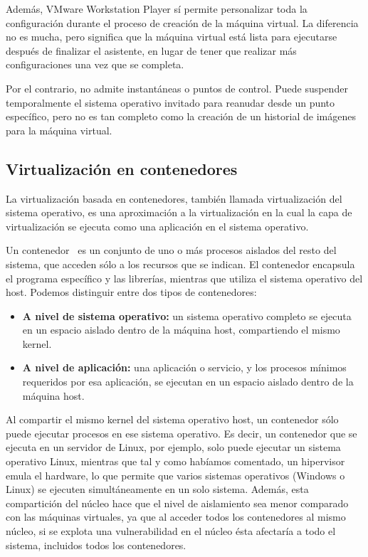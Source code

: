 	Además, VMware Workstation Player sí permite personalizar toda la configuración durante el proceso de creación de la máquina virtual. La diferencia no es mucha, pero significa que la máquina virtual está lista para ejecutarse después de finalizar el asistente, en lugar de tener que realizar más configuraciones una vez que se completa.

	Por el contrario, no admite instantáneas o puntos de control. Puede suspender temporalmente el sistema operativo invitado para reanudar desde un punto específico, pero no es tan completo como la creación de un historial de imágenes para la máquina virtual.

	\clearpage

\subsection{Virtualización en contenedores} \label{sec:cont}
	La virtualización basada en contenedores, también llamada virtualización del sistema operativo, es una aproximación a la virtualización en la cual la capa de virtualización se ejecuta como una aplicación en el sistema operativo.

	Un contenedor~\cite{cont1} es un conjunto de uno o más procesos aislados del resto del sistema, que acceden sólo a los recursos que se indican. El contenedor encapsula el programa específico y las librerías, mientras que utiliza el sistema operativo del host. Podemos distinguir entre dos tipos de contenedores:~\cite{cont2}

	\begin{itemize}
		\item \textbf{A nivel de sistema operativo:} un sistema operativo completo se ejecuta en un espacio aislado dentro de la máquina host, compartiendo el mismo kernel.
		\item \textbf{A nivel de aplicación:} una aplicación o servicio, y los procesos mínimos requeridos por esa aplicación, se ejecutan en un espacio aislado dentro de la máquina host.
	\end{itemize}

	Al compartir el mismo kernel del sistema operativo host, un contenedor sólo puede ejecutar procesos en ese sistema operativo. Es decir, un contenedor que se ejecuta en un servidor de Linux, por ejemplo, solo puede ejecutar un sistema operativo Linux, mientras que tal y como habíamos comentado, un hipervisor emula el hardware, lo que permite que varios sistemas operativos (Windows o Linux) se ejecuten simultáneamente en un solo sistema. Además, esta compartición del núcleo hace que el nivel de aislamiento sea menor comparado con las máquinas virtuales, ya que al acceder todos los contenedores al mismo núcleo, si se explota una vulnerabilidad en el núcleo ésta afectaría a todo el sistema, incluidos todos los contenedores.

